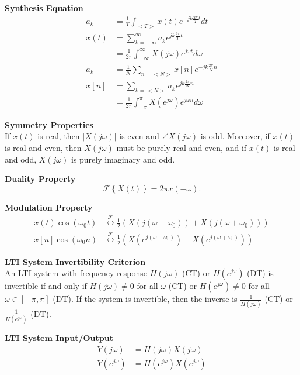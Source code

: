 \documentclass{article}
\begin{document}
\begin{multicols}{2}
    \noindent\textbf{Synthesis Equation}
    \begin{align*}
        a_k  & = \frac{1}{T} \int_{<T>} x(t) e^{-jk\frac{2\pi}{T} t} dt                  \\
        x(t) & = \sum_{k=-\infty}^{\infty} a_k e^{jk\frac{2\pi}{T} t}                    \\
             & = \frac{1}{2\pi} \int_{-\infty}^{\infty} X(j\omega) e^{j\omega t} d\omega \\
        a_k  & = \frac{1}{N} \sum_{n=<N>} x[n] e^{-jk\frac{2\pi}{N}n}                    \\
        x[n] & = \sum_{k=<N>} a_k e^{jk\frac{2\pi}{N} n}                                 \\
             & = \frac{1}{2\pi} \int_{-\pi}^{\pi} X(e^{j\omega}) e^{j\omega n} d\omega
    \end{align*}

    \noindent\textbf{Symmetry Properties} \\
    If $x(t)$ is real, then $|X(j\omega)|$ is even and
    $\angle X(j\omega)$ is odd. Moreover, if $x(t)$ is real
    and even, then $X(j\omega)$ must be purely real and even,
    and if $x(t)$ is real and odd, $X(j\omega)$ is purely
    imaginary and odd.

    \noindent\textbf{Duality Property}
    \[ \label{eq:duality}
        \mathcal{F}\left\{ X(t) \right\} = 2\pi x(-\omega).
    \]

    \noindent\textbf{Modulation Property} \\
    \begin{align*}
        x(t)\cos(\omega_0 t) & \overset{\mathcal{F}}{\leftrightarrow} \frac{1}{2}\left( X(j(\omega-\omega_0)) + X(j(\omega+\omega_0))\right)          \\
        x[n]\cos(\omega_0 n) & \overset{\mathcal{F}}{\leftrightarrow}  \frac{1}{2}\left( X(e^{j(\omega-\omega_0)}) + X(e^{j(\omega+\omega_0)})\right)
    \end{align*}

    \noindent\textbf{LTI System Invertibility Criterion} \\
    An LTI system with frequency response $H(j\omega)$ (CT) or $H(e^{j\omega})$ (DT) is
    invertible if and only if $H(j\omega) \neq 0$ for all $\omega$ (CT) or $H(e^{j\omega})
        \neq 0$ for all $\omega \in [-\pi, \pi]$ (DT). If the system is invertible, then the
    inverse is $\frac{1}{H(j\omega)}$ (CT) or $\frac{1}{H(e^{j\omega})}$ (DT).

    \noindent\textbf{LTI System Input/Output}
    \begin{align*}
        Y(j\omega)     & = H(j\omega)X(j\omega)         \\
        Y(e^{j\omega}) & = H(e^{j\omega})X(e^{j\omega})
    \end{align*}


\end{multicols}
\end{document}
